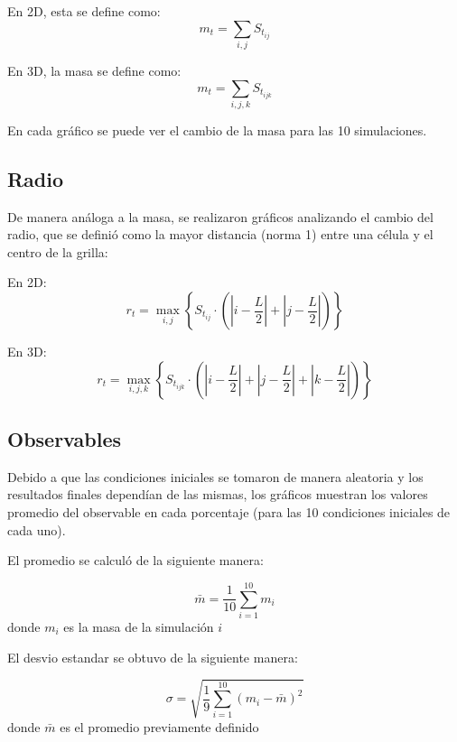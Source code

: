 En 2D, esta se define como:
\begin{equation}
m_t = \sum_{i,j}{S_{t_{ij}}}
\end{equation}

En 3D, la masa se define como:
\begin{equation}
m_t = \sum_{i,j,k}{S_{t_{ijk}}}
\end{equation}

En cada gráfico se puede ver el cambio de la masa para las 10 simulaciones.

\subsection{Radio}
De manera análoga a la masa, se realizaron gráficos analizando el cambio del radio, que se definió como la mayor distancia (norma 1) entre una célula y el centro de la grilla:

En 2D:
\begin{equation}
r_t = \max_{i,j}{\left\{ S_{t_{ij}} \cdot \left( \left| i - \frac{L}{2} \right| + \left| j - \frac{L}{2} \right| \right) \right\}}
\end{equation}


En 3D:
\begin{equation}
r_t = \max_{i,j,k}{\left\{ S_{t_{ijk}} \cdot \left( \left| i - \frac{L}{2} \right| + \left| j - \frac{L}{2} \right| + \left| k - \frac{L}{2} \right| \right) \right\}}
\end{equation}


\subsection{Observables}
Debido a que las condiciones iniciales se tomaron de manera aleatoria y los resultados finales dependían de las mismas, los gráficos muestran los valores promedio del observable en cada porcentaje (para las 10 condiciones iniciales de cada uno).

El promedio se calculó de la siguiente manera:

\begin{equation}
    \label{eq:mean}
    \bar{m} = \frac{1}{10} \sum_{i=1}^{10} m_i
\end{equation}
donde $m_i$ es la masa de la simulación $i$

El desvio estandar se obtuvo de la siguiente manera:

\begin{equation}
    \label{eq:std}
    \sigma = \sqrt{\frac{1}{9} \sum_{i=1}^{10} (m_i - \bar{m})^2}
\end{equation}
donde $\bar{m}$ es el promedio previamente definido

